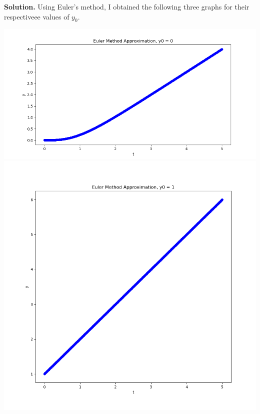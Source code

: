 \documentclass[11pt, letterpaper]{report}
\newenvironment{soln}[1][]{\noindent\textbf{Solution. }}{\hfill\qedsymbol}
\begin{document}
\begin{soln}
	Using Euler's method, I obtained the following three graphs for their respectiveee values of $y_0$.
	\begin{center}
		\includegraphics[scale=0.5]{SuperEuler.png}
		\includegraphics[scale=0.5]{SuperEuler1.png}

\end{center}
\end{soln}
\end{document}
